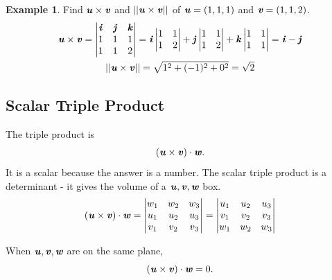 \documentclass[12pt, letterpaper]{article}
\newcommand{\V}[1]{\textbf{\textit{#1}}}
\theoremstyle{definition}
\newtheorem{example}{Example}
\begin{document}
\begin{example}
	Find $\V{u} \times \V{v}$ and $||\V{u} \times \V{v}||$ of $\V{u} = (1,1,1)$ and $\V{v} = (1,1,2)$.
		\begin{gather*}
		\V{u} \times \V{v} = \begin{vmatrix}
								\V{i} & \V{j} &\V{k} \\
								1 & 1 & 1 \\
								1 & 1 & 2
								\end{vmatrix} = \V{i}\begin{vmatrix}
													1 & 1 \\
													1 & 2
													\end{vmatrix} + \V{j}\begin{vmatrix}
																			1 & 1 \\
																			1 & 2
																			\end{vmatrix} + \V{k}\begin{vmatrix}
																									1 & 1 \\
																									1 & 1
																									\end{vmatrix} = \V{i} - \V{j} \\
		||\V{u} \times \V{v}|| = \sqrt{1^2 + (-1)^2 + 0^2} = \sqrt{2}
		\end{gather*}
\end{example}


\subsection{Scalar Triple Product}
	The triple product is \[ (\V{u} \times \V{v})\cdot\V{w}.\] It is a scalar because the answer is a number. The scalar triple product is a determinant - it gives the volume of a $\V{u}, \V{v}, \V{w}$ box. \[ (\V{u} \times \V{v})\cdot\V{w} = \begin{vmatrix}
																		 w_1 & w_2 & w_3 \\
																		 u_1 & u_2 & u_3 \\
																		 v_1 & v_2 & v_3
																		\end{vmatrix} = \begin{vmatrix}
																							u_1 & u_2 & u_3 \\
																							v_1 & v_2 & v_3 \\
																							w_1 & w_2 & w_3
																							\end{vmatrix}\]

When $\V{u}, \V{v}, \V{w}$ are on the same plane, \[ (\V{u} \times \V{v})\cdot\V{w} = 0.\]
\end{document}
